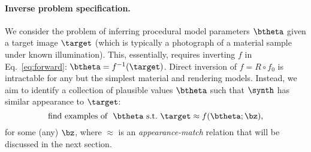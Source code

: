 \paragraph*{Inverse problem specification.}
We consider the problem of inferring procedural model parameters $\btheta$ given a target image $\target$  (which is typically a photograph of a material sample under known illumination).
This, essentially, requires inverting $f$ in Eq.~\eqref{eq:forward}: $\btheta = f^{-1}(\target)$. Direct inversion of $f = R \circ f_0$ is intractable for any but the simplest material and rendering models.
Instead, we aim to identify a collection of plausible values $\btheta$ such that $\synth$ has similar appearance to $\target$:
%
\begin{equation}
	\label{eq:approx}
	\mbox{find examples of } \ \btheta \ \mbox{s.t.} \ \target \approx f(\btheta; \bz),
\end{equation}
%
for some (any) $\bz$, where $\approx$ is an \emph{appearance-match} relation that will be discussed in the next section.
